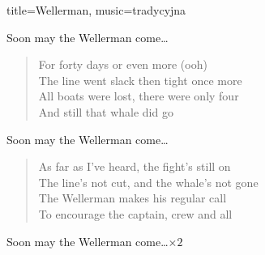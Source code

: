 \begin{song}{title={Wellerman}, music={tradycyjna}}
\begin{multicols}{2}
    \begin{chorus}
        Soon may the Wellerman come\ldots
    \end{chorus}
    \begin{verse}
        For forty days or even more (ooh) \\
        The line went slack then tight once more \\
        All boats were lost, there were only four \\
        And still that whale did go
    \end{verse}
    \begin{chorus}
        Soon may the Wellerman come\ldots
    \end{chorus}
    \begin{verse}
        As far as I've heard, the fight's still on \\
        The line's not cut, and the whale's not gone \\
        The Wellerman makes his regular call \\
        To encourage the captain, crew and all
    \end{verse}
    \begin{chorus}
        Soon may the Wellerman come\ldots $\times 2$
    \end{chorus}
\end{multicols}
\end{song}

